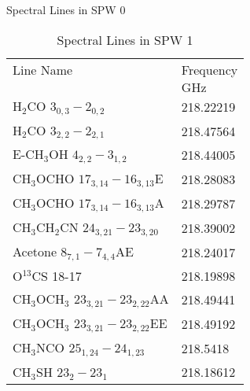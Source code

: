 \begin{table*}[htp]
\begin{minipage}[t]{0.5\textwidth}
\centering
\caption{Spectral Lines in SPW 0}

\begin{tabular}{ll}
\label{tab:linesspw0}
Line Name & Frequency \\
 & $\mathrm{GHz}$ \\
\hline
H$_2$CO $3_{0,3}-2_{0,2}$ & 218.22219 \\
H$_2$CO $3_{2,2}-2_{2,1}$ & 218.47564 \\
E-CH$_3$OH $4_{2,2}-3_{1,2}$ & 218.44005 \\
CH$_3$OCHO $17_{3,14}-16_{3,13}$E & 218.28083 \\
CH$_3$OCHO $17_{3,14}-16_{3,13}$A & 218.29787 \\
CH$_3$CH$_2$CN $24_{3,21}-23_{3,20}$ & 218.39002 \\
Acetone $8_{7,1}-7_{4,4}$AE & 218.24017 \\
O$^{13}$CS 18-17 & 218.19898 \\
CH$_3$OCH$_3$ $23_{3,21}-23_{2,22}$AA & 218.49441 \\
CH$_3$OCH$_3$ $23_{3,21}-23_{2,22}$EE & 218.49192 \\
CH$_3$NCO $25_{1,24} - 24_{1,23}$ & 218.5418 \\
CH$_3$SH $23_2-23_1$ & 218.18612 \\
\hline
\end{tabular}

\end{minipage}
\begin{minipage}[t]{0.5\textwidth}
\centering
\caption{Spectral Lines in SPW 1}


\end{minipage}
\end{table*}
